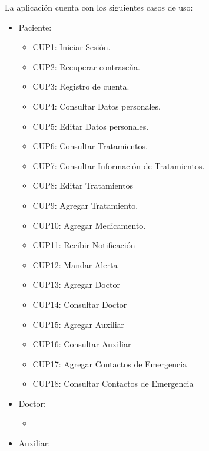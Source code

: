 La aplicación cuenta con los siguientes casos de uso:
\begin{itemize}
	\item Paciente:
		\begin{itemize}
			\item CUP1: Iniciar Sesión.
			\item CUP2: Recuperar contraseña.
			\item CUP3: Registro de cuenta.
			\item CUP4: Consultar Datos personales.
			\item CUP5: Editar Datos personales.
			\item CUP6: Consultar Tratamientos.
			\item CUP7: Consultar Información de Tratamientos.
			\item CUP8: Editar Tratamientos
			\item CUP9: Agregar Tratamiento.
			\item CUP10: Agregar Medicamento.
			\item CUP11: Recibir Notificación
			\item CUP12: Mandar Alerta
			\item CUP13: Agregar Doctor
			\item CUP14: Consultar Doctor
			\item CUP15: Agregar Auxiliar
			\item CUP16: Consultar Auxiliar
			\item CUP17: Agregar Contactos de Emergencia
			\item CUP18: Consultar Contactos de Emergencia
		\end{itemize}
	\item Doctor:
		\begin{itemize}
			\item 
		\end{itemize}
	\item Auxiliar:
	
\end{itemize}
%	
